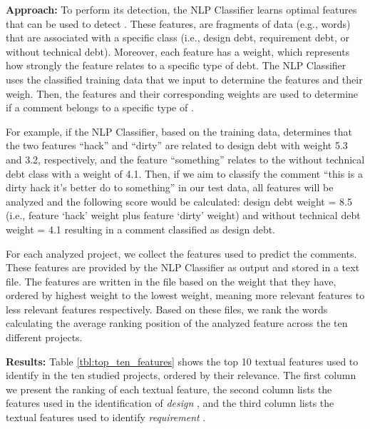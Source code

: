 \vspace{1mm}
\noindent \textbf{Approach:} To perform its detection, the NLP Classifier learns optimal features that can be used to detect \SATD. These features, are fragments of data (e.g., words) that are associated with a specific class (i.e., design debt, requirement debt, or without technical debt). Moreover, each feature has a weight, which represents how strongly the feature relates to a specific type of debt. The NLP Classifier uses the classified training data that we input to determine the features and their weigh. Then, the features and their corresponding weights are used to determine if a comment belongs to a specific type of \SATD.

For example, if the NLP Classifier, based on the training data, determines that the two features ``hack'' and ``dirty'' are related to design debt with weight 5.3 and 3.2, respectively, and the feature ``something'' relates to the without technical debt class with a weight of 4.1. Then, if we aim to classify the comment ``this is a dirty hack it's better do to something'' in our test data, all features will be analyzed and the following score would be calculated: design debt weight = 8.5 (i.e., feature `hack' weight plus feature `dirty' weight) and without technical debt weight = 4.1 resulting in a comment classified as design debt.


For each analyzed project, we collect the features used to predict the \SATD comments. These features are provided by the NLP Classifier as output and stored in a text file. The features are written in the file based on the weight that they have, ordered by highest weight to the lowest weight, meaning more relevant features to less relevant features respectively. Based on these files, we rank the words calculating the average ranking position of the analyzed feature across the ten different projects. 


\noindent \textbf{Results:} Table \ref{tbl:top_ten_features} shows the top 10 textual features used to identify  \SATD in the ten studied projects, ordered by their relevance. The first column we present the ranking of each textual feature, the second column lists the features used in the identification of \emph{design} \SATD, and the third column lists the textual features used to identify \emph{requirement} \SATD.

